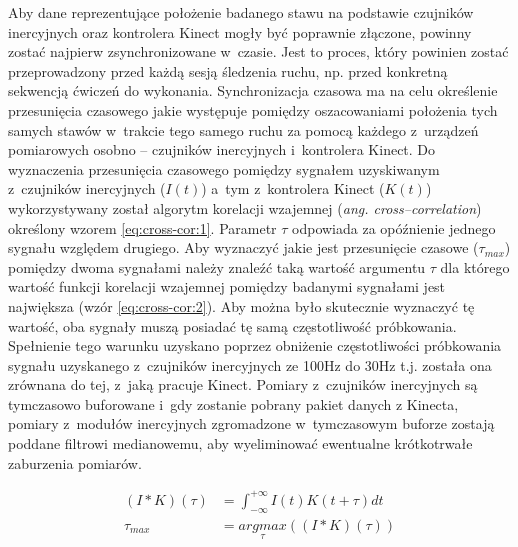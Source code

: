 Aby dane reprezentujące położenie badanego stawu na podstawie czujników inercyjnych oraz kontrolera Kinect mogły być poprawnie złączone, powinny zostać najpierw zsynchronizowane w~czasie. Jest to proces, który powinien zostać przeprowadzony przed każdą sesją śledzenia ruchu, np. przed konkretną sekwencją ćwiczeń do wykonania. Synchronizacja czasowa ma na celu określenie przesunięcia czasowego jakie występuje pomiędzy oszacowaniami położenia tych samych stawów w~trakcie tego samego ruchu za pomocą każdego z~urządzeń pomiarowych osobno -- czujników inercyjnych i~kontrolera Kinect. Do wyznaczenia przesunięcia czasowego pomiędzy sygnałem uzyskiwanym z~czujników inercyjnych ($I(t)$) a~tym z~kontrolera Kinect ($K(t)$) wykorzystywany został algorytm korelacji wzajemnej (\emph{ang. cross--correlation}) określony wzorem \ref{eq:cross-cor:1}. Parametr $\tau$ odpowiada za opóźnienie jednego sygnału względem drugiego. Aby wyznaczyć jakie jest przesunięcie czasowe ($\tau_{max}$) pomiędzy dwoma sygnałami należy znaleźć taką wartość argumentu $\tau$ dla którego wartość funkcji korelacji wzajemnej pomiędzy badanymi sygnałami jest największa (wzór \ref{eq:cross-cor:2}). Aby można było skutecznie wyznaczyć tę wartość, oba sygnały muszą posiadać tę samą częstotliwość próbkowania. Spełnienie tego warunku uzyskano poprzez obniżenie częstotliwości próbkowania sygnału uzyskanego z~czujników inercyjnych ze 100Hz  do 30Hz t.j. została ona zrównana do tej, z~jaką pracuje Kinect. Pomiary z~czujników inercyjnych są tymczasowo buforowane i~gdy zostanie pobrany pakiet danych 
z Kinecta, pomiary z~modułów inercyjnych zgromadzone w~tymczasowym buforze 
zostają poddane filtrowi medianowemu, aby wyeliminować ewentualne krótkotrwałe zaburzenia pomiarów. 

\begin{subequations}
	\begin{align}
		(I \ast K)(\tau) & = \int_{-\infty}^{+\infty}I(t)K(t+\tau)dt\label{eq:cross-cor:1}   \\
		\tau_{max}       & = \underset{\tau}{argmax}((I \ast K)(\tau))\label{eq:cross-cor:2} 
	\end{align}
	\label{eq:cross-cor}
\end{subequations}

